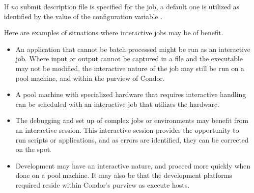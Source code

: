 If \emph{no} submit description file is specified for the job,
a default one is utilized as identified by the value of the
configuration variable .

Here are examples of situations where interactive jobs may be
of benefit.
\begin{itemize}
\item An application that cannot be batch processed might be run
as an interactive job.
Where input or output cannot be captured in a file and the
executable may not be modified,
the interactive nature of the job may still be run on a pool
machine, and within the purview of Condor.
\item A pool machine with specialized hardware that requires
interactive handling can be scheduled with an interactive
job that utilizes the hardware.
\item The debugging and set up of complex jobs or environments
may benefit from an interactive session.
This interactive session provides the opportunity to run scripts 
or applications, 
and as errors are identified, 
they can be corrected on the spot.
\item Development may have an interactive nature,
and proceed more quickly when done on a pool machine.
It may also be that the development platforms required
reside within Condor's purview as execute hosts. 
\end{itemize}
